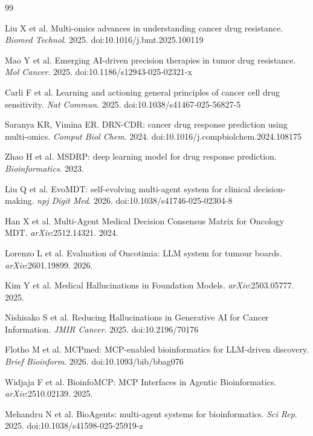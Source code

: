 \documentclass[12pt, letterpaper]{article}
\begin{document}
{\small
\begin{thebibliography}{99}
\setlength{\itemsep}{0pt}

 Liu X et al. Multi-omics advances in understanding cancer drug resistance. \textit{Biomed Technol}. 2025. doi:10.1016/j.bmt.2025.100119

 Mao Y et al. Emerging AI-driven precision therapies in tumor drug resistance. \textit{Mol Cancer}. 2025. doi:10.1186/s12943-025-02321-x

 Carli F et al. Learning and actioning general principles of cancer cell drug sensitivity. \textit{Nat Commun}. 2025. doi:10.1038/s41467-025-56827-5

 Saranya KR, Vimina ER. DRN-CDR: cancer drug response prediction using multi-omics. \textit{Comput Biol Chem}. 2024. doi:10.1016/j.compbiolchem.2024.108175

 Zhao H et al. MSDRP: deep learning model for drug response prediction. \textit{Bioinformatics}. 2023.

 Liu Q et al. EvoMDT: self-evolving multi-agent system for clinical decision-making. \textit{npj Digit Med}. 2026. doi:10.1038/s41746-025-02304-8

 Han X et al. Multi-Agent Medical Decision Consensus Matrix for Oncology MDT. \textit{arXiv}:2512.14321. 2024.

 Lorenzo L et al. Evaluation of Oncotimia: LLM system for tumour boards. \textit{arXiv}:2601.19899. 2026.

 Kim Y et al. Medical Hallucinations in Foundation Models. \textit{arXiv}:2503.05777. 2025.

 Nishisako S et al. Reducing Hallucinations in Generative AI for Cancer Information. \textit{JMIR Cancer}. 2025. doi:10.2196/70176

 Flotho M et al. MCPmed: MCP-enabled bioinformatics for LLM-driven discovery. \textit{Brief Bioinform}. 2026. doi:10.1093/bib/bbag076

 Widjaja F et al. BioinfoMCP: MCP Interfaces in Agentic Bioinformatics. \textit{arXiv}:2510.02139. 2025.

 Mehandru N et al. BioAgents: multi-agent systems for bioinformatics. \textit{Sci Rep}. 2025. doi:10.1038/s41598-025-25919-z

\end{thebibliography}
}
\end{document}
